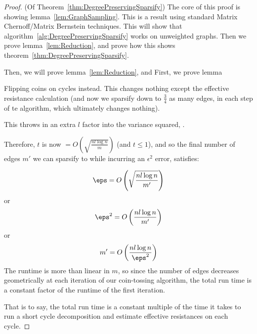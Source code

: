 \begin{proof}(Of Theorem~\ref{thm:DegreePreservingSparsify})
  The core of this proof is showing lemma~\ref{lem:GraphSampling}. This is a
  result using standard Matrix Chernoff/Matrix Bernstein techniques. This will show that
  algorithm~\ref{alg:DegreePreservingSparsify} works on unweighted graphs.
   Then we prove lemma~\ref{lem:Reduction}, and
  prove how this shows theorem~\ref{thm:DegreePreservingSparsify}.



  Then, we will prove
  lemma~\ref{lem:Reduction}, and 
  First, we prove lemma 


    Flipping coins on cycles instead. This changes nothing except the effective resistance calculation (and now
    we sparsify down to $\frac{3}{4}$ as many edges, in each step of te
    algorithm, which ultimately changes nothing).

    This throws in an extra $l$ factor into the variance squared,
    .

    Therefore, $t$ is now $= O\left(\sqrt{\frac{nl \log n}{m}}\right)$ (and $t
    \leq 1$), and so the final number of edges $m'$ we can sparsify to while
    incurring an $\epsilon^2$ error, satisfies:

    \begin{align}
       \eps = O\left(\sqrt{\frac{nl \log n}{m'}}\right)
    \end{align}
    or
    \begin{align}
       \eps^2 = O\left(\frac{nl \log n}{m'}\right)
    \end{align}
    or
    \begin{align}
       m' = O\left(\frac{nl \log n}{\eps^2}\right)
    \end{align}
    The runtime is more than linear in $m$, so since the number of edges
    decreases geometrically at each iteration of our coin-tossing algorithm,
    the total run time is a constant factor of the runtime of the first iteration.

    That is to say, the total run time is a constant multiple of the time it takes
    to run a short cycle decomposition and estimate effective resistances on each cycle.
\end{proof}


